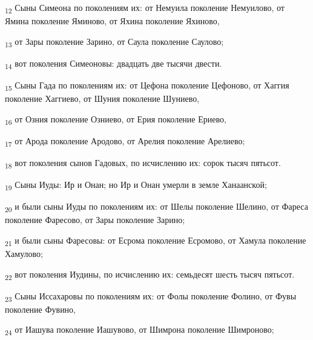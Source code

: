 \begin{tcolorbox}
\textsubscript{12} Сыны Симеона по поколениям их: от Немуила поколение Немуилово, от Ямина поколение Яминово, от Яхина поколение Яхиново,
\end{tcolorbox}
\begin{tcolorbox}
\textsubscript{13} от Зары поколение Зарино, от Саула поколение Саулово;
\end{tcolorbox}
\begin{tcolorbox}
\textsubscript{14} вот поколения Симеоновы: двадцать две тысячи двести.
\end{tcolorbox}
\begin{tcolorbox}
\textsubscript{15} Сыны Гада по поколениям их: от Цефона поколение Цефоново, от Хаггия поколение Хаггиево, от Шуния поколение Шуниево,
\end{tcolorbox}
\begin{tcolorbox}
\textsubscript{16} от Озния поколение Озниево, от Ерия поколение Ериево,
\end{tcolorbox}
\begin{tcolorbox}
\textsubscript{17} от Арода поколение Ародово, от Арелия поколение Арелиево;
\end{tcolorbox}
\begin{tcolorbox}
\textsubscript{18} вот поколения сынов Гадовых, по исчислению их: сорок тысяч пятьсот.
\end{tcolorbox}
\begin{tcolorbox}
\textsubscript{19} Сыны Иуды: Ир и Онан; но Ир и Онан умерли в земле Ханаанской;
\end{tcolorbox}
\begin{tcolorbox}
\textsubscript{20} и были сыны Иуды по поколениям их: от Шелы поколение Шелино, от Фареса поколение Фаресово, от Зары поколение Зарино;
\end{tcolorbox}
\begin{tcolorbox}
\textsubscript{21} и были сыны Фаресовы: от Есрома поколение Есромово, от Хамула поколение Хамулово;
\end{tcolorbox}
\begin{tcolorbox}
\textsubscript{22} вот поколения Иудины, по исчислению их: семьдесят шесть тысяч пятьсот.
\end{tcolorbox}
\begin{tcolorbox}
\textsubscript{23} Сыны Иссахаровы по поколениям их: от Фолы поколение Фолино, от Фувы поколение Фувино,
\end{tcolorbox}
\begin{tcolorbox}
\textsubscript{24} от Иашува поколение Иашувово, от Шимрона поколение Шимроново;
\end{tcolorbox}
